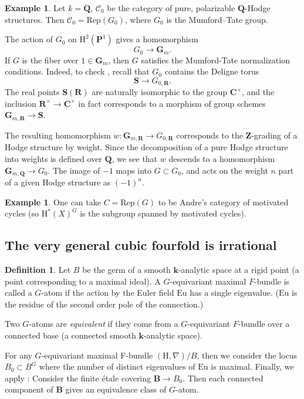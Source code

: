 \documentclass[11pt, reqno]{amsart}
\numberwithin{equation}{section}
\theoremstyle{plain}
\theoremstyle{definition}
\newtheorem{definition}[theorem]{Definition}
\newtheorem{example}[theorem]{Example}
\theoremstyle{italicsname}
\newcommand{\bB}{\mathbf{B}}
\newcommand{\cC}{\mathscr{C}}
\newcommand{\rH}{\mathrm{H}}
\newcommand{\bC}{\mathbf{C}}
\newcommand{\bG}{\mathbf{G}}
\newcommand{\bZ}{\mathbf{Z}}
\newcommand{\bP}{\mathbf{P}}
\newcommand{\bQ}{\mathbf{Q}}
\newcommand{\bR}{\mathbf{R}}
\newcommand{\bS}{\mathbf{S}}
\newcommand{\bk}{\mathbf{k}}
\newcommand{\euler}{\mathrm{Eu}}
\begin{document}
\begin{example}
\label{ex:mumford-tate}
    Let $k = \bQ$, $\cC_0$ be the category of pure, polarizable $\bQ$-Hodge structures. Then $\cC_0 = \mathrm{Rep}(G_0)$, where $G_0$ is the Mumford--Tate group. 

    The action of $G_0$ on $\rH^2(\bP^1)$ gives a homomorphism
    \[
        G_0 \to \bG_m.
    \]
    If $G$ is the fiber over $1 \in \bG_m$, then $G$ satisfies the Mumford-Tate normalization conditions. Indeed, to check , recall that $G_0$ contains the Deligne torus 
    \[
        \bS \to G_{0, \bR}.
    \]
    The real points $\bS(\bR)$ are naturally isomorphic to the group $\bC^\times$, and the inclusion $\bR^\times \to \bC^\times$ in fact corresponds to a morphism of group schemes $\bG_{m, \bR} \to \bS$. 

    The resulting homomorphism $w:\bG_{m, \bR} \to G_{0, \bR}$ corresponds to the $\bZ$-grading of a Hodge structure by weight. Since the decomposition of a pure Hodge structure into weights is defined over $\bQ$, we see that $w$ descends to a homomorphism $\bG_{m, \bQ} \to G_0$. The image of $-1$ maps into $G \subset G_0$, and acts on the weight $n$ part of a given Hodge structure as $(-1)^n$. 
\end{example}

\begin{example}
\label{ex:motivated-cycle}
    One can take $C = \mathrm{Rep}(G)$ to be Andre's category of motivated cycles (so $\rH^*(X)^G$ is the subgroup spanned by motivated cycles).
\end{example}

\subsection{The very general cubic fourfold is irrational}

\begin{definition}
Let $B$ be the germ of a smooth $\bk$-analytic space at a rigid point (a point corresponding to a maximal ideal). A $G$-equivariant maximal $F$-bundle is called a $G$-atom if the action by the Euler field $\euler$ has a single eigenvalue. ($\euler$ is the residue of the second order pole of the connection.)

Two $G$-atoms are \emph{equivalent} if they come from a $G$-equivariant $F$-bundle over a connected base (a connected smooth $\bk$-analytic space).
\end{definition}

For any $G$-equivariant maximal F-bundle $(\rH, \nabla)/B$, then we consider the locus $B_0 \subset B^G$ where the number of distinct eigenvalues of $\euler$ is maximal. Finally, we apply : Consider the finite \'etale covering $\bB \to B_0$. Then each connected component of $\bB$ gives an equivalence class of $G$-atom. 
\end{document}
